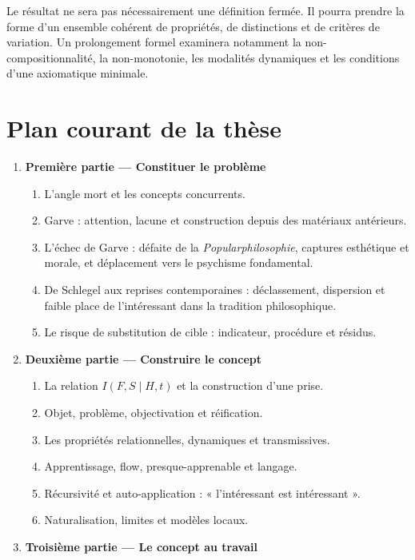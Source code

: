 \documentclass[11pt,a4paper]{article}
\begin{document}
Le résultat ne sera pas nécessairement une définition fermée. Il pourra prendre
la forme d'un ensemble cohérent de propriétés, de distinctions et de critères de
variation. Un prolongement formel examinera notamment la
non-compositionnalité, la non-monotonie, les modalités dynamiques et les
conditions d'une axiomatique minimale.

\section{Plan courant de la thèse}

\begin{enumerate}
  \item \textbf{Première partie --- Constituer le problème}
    \begin{enumerate}
      \item L'angle mort et les concepts concurrents.
      \item Garve : attention, lacune et construction depuis des matériaux
            antérieurs.
      \item L'échec de Garve : défaite de la \emph{Popularphilosophie}, captures
            esthétique et morale, et déplacement vers le psychisme fondamental.
      \item De Schlegel aux reprises contemporaines : déclassement, dispersion
            et faible place de l'intéressant dans la tradition philosophique.
      \item Le risque de substitution de cible : indicateur, procédure et résidus.
    \end{enumerate}
  \item \textbf{Deuxième partie --- Construire le concept}
    \begin{enumerate}
      \item La relation \(I(F,S\mid H,t)\) et la construction d'une prise.
      \item Objet, problème, objectivation et réification.
      \item Les propriétés relationnelles, dynamiques et transmissives.
      \item Apprentissage, flow, presque-apprenable et langage.
      \item Récursivité et auto-application : « l'intéressant est intéressant ».
      \item Naturalisation, limites et modèles locaux.
    \end{enumerate}
  \item \textbf{Troisième partie --- Le concept au travail}

\end{enumerate}
\end{document}
